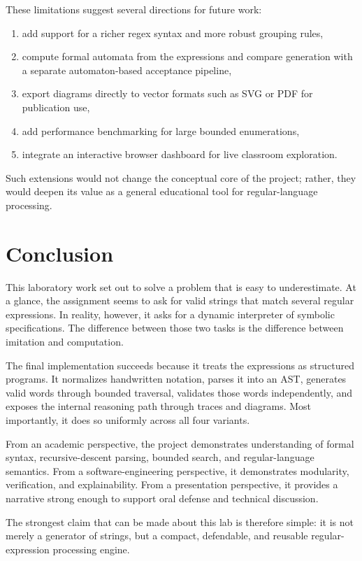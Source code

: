 \documentclass[a4paper,12pt]{article}
\begin{document}
These limitations suggest several directions for future work:

\begin{enumerate}[label=\arabic*.]
    \item add support for a richer regex syntax and more robust grouping rules,
    \item compute formal automata from the expressions and compare generation with a separate automaton-based acceptance pipeline,
    \item export diagrams directly to vector formats such as SVG or PDF for publication use,
    \item add performance benchmarking for large bounded enumerations,
    \item integrate an interactive browser dashboard for live classroom exploration.
\end{enumerate}

Such extensions would not change the conceptual core of the project; rather, they would deepen its value as a general educational tool for regular-language processing.

\section{Conclusion}

This laboratory work set out to solve a problem that is easy to underestimate. At a glance, the assignment seems to ask for valid strings that match several regular expressions. In reality, however, it asks for a dynamic interpreter of symbolic specifications. The difference between those two tasks is the difference between imitation and computation.

The final implementation succeeds because it treats the expressions as structured programs. It normalizes handwritten notation, parses it into an AST, generates valid words through bounded traversal, validates those words independently, and exposes the internal reasoning path through traces and diagrams. Most importantly, it does so uniformly across all four variants.

From an academic perspective, the project demonstrates understanding of formal syntax, recursive-descent parsing, bounded search, and regular-language semantics. From a software-engineering perspective, it demonstrates modularity, verification, and explainability. From a presentation perspective, it provides a narrative strong enough to support oral defense and technical discussion.

The strongest claim that can be made about this lab is therefore simple: it is not merely a generator of strings, but a compact, defendable, and reusable regular-expression processing engine.
\end{document}
